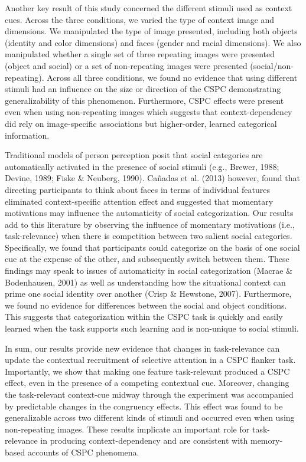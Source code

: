 \documentclass[english,,man,floatsintext]{apa6}
\begin{document}
Another key result of this study concerned the different stimuli used as context cues. Across the three conditions, we varied the type of context image and dimensions. We manipulated the type of image presented, including both objects (identity and color dimensions) and faces (gender and racial dimensions). We also manipulated whether a single set of three repeating images were presented (object and social) or a set of non-repeating images were presented (social/non-repeating). Across all three conditions, we found no evidence that using different stimuli had an influence on the size or direction of the CSPC demonstrating generalizability of this phenomenon. Furthermore, CSPC effects were present even when using non-repeating images which suggests that context-dependency did rely on image-specific associations but higher-order, learned categorical information.

Traditional models of person perception posit that social categories are automatically activated in the presence of social stimuli (e.g., Brewer, 1988; Devine, 1989; Fiske \& Neuberg, 1990). Cañadas et al. (2013) however, found that directing participants to think about faces in terms of individual features eliminated context-specific attention effect and suggested that momentary motivations may influence the automaticity of social categorization. Our results add to this literature by observing the influence of momentary motivations (i.e., task-relevance) when there is competition between two salient social categories. Specifically, we found that participants could categorize on the basis of one social cue at the expense of the other, and subsequently switch between them. These findings may speak to issues of automaticity in social categorization (Macrae \& Bodenhausen, 2001) as well as understanding how the situational context can prime one social identity over another (Crisp \& Hewstone, 2007). Furthermore, we found no evidence for differences between the social and object conditions. This suggests that categorization within the CSPC task is quickly and easily learned when the task supports such learning and is non-unique to social stimuli.

In sum, our results provide new evidence that changes in task-relevance can update the contextual recruitment of selective attention in a CSPC flanker task. Importantly, we show that making one feature task-relevant produced a CSPC effect, even in the presence of a competing contextual cue. Moreover, changing the task-relevant context-cue midway through the experiment was accompanied by predictable changes in the congruency effects. This effect was found to be generalizable across two different kinds of stimuli and occurred even when using non-repeating images. These results implicate an important role for task-relevance in producing context-dependency and are consistent with memory-based accounts of CSPC phenomena.
\end{document}
